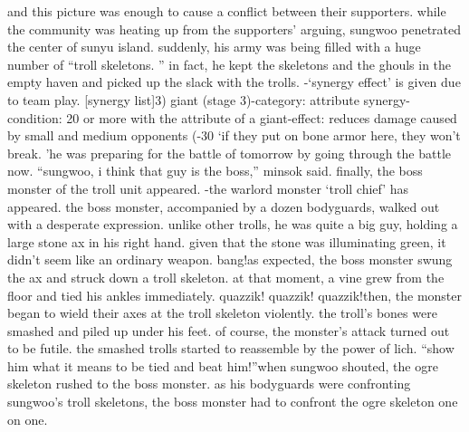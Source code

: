  and this picture was enough to cause a conflict between their supporters.
while the community was heating up from the supporters’ arguing, sungwoo penetrated the center of sunyu island.
suddenly, his army was being filled with a huge number of “troll skeletons.
” in fact, he kept the skeletons and the ghouls in the empty haven and picked up the slack with the trolls.
-‘synergy effect’ is given due to team play.
[synergy list]3) giant (stage 3)-category: attribute synergy-condition: 20 or more with the attribute of a giant-effect: reduces damage caused by small and medium opponents (-30%
‘if they put on bone armor here, they won’t break.
’he was preparing for the battle of tomorrow by going through the battle now.
“sungwoo, i think that guy is the boss,” minsok said.
finally, the boss monster of the troll unit appeared.
-the warlord monster ‘troll chief’ has appeared.
the boss monster, accompanied by a dozen bodyguards, walked out with a desperate expression.
unlike other trolls, he was quite a big guy, holding a large stone ax in his right hand.
given that the stone was illuminating green, it didn’t seem like an ordinary weapon.
bang!as expected, the boss monster swung the ax and struck down a troll skeleton.
 at that moment, a vine grew from the floor and tied his ankles immediately.
quazzik! quazzik! quazzik!then, the monster began to wield their axes at the troll skeleton violently.
the troll’s bones were smashed and piled up under his feet.
of course, the monster’s attack turned out to be futile.
the smashed trolls started to reassemble by the power of lich.
“show him what it means to be tied and beat him!”when sungwoo shouted, the ogre skeleton rushed to the boss monster.
 as his bodyguards were confronting sungwoo’s troll skeletons, the boss monster had to confront the ogre skeleton one on one.


